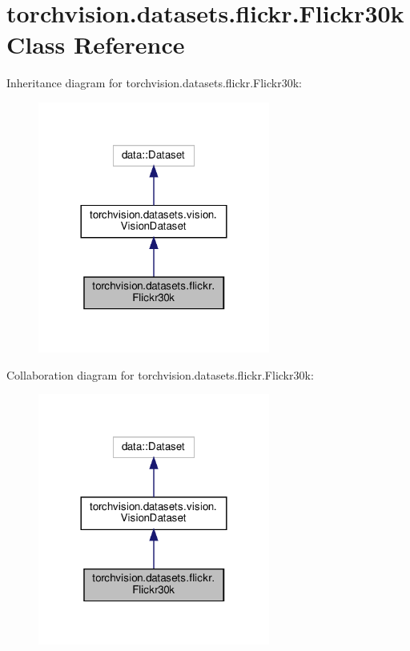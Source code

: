 \hypertarget{classtorchvision_1_1datasets_1_1flickr_1_1Flickr30k}{}\section{torchvision.\+datasets.\+flickr.\+Flickr30k Class Reference}
\label{classtorchvision_1_1datasets_1_1flickr_1_1Flickr30k}


Inheritance diagram for torchvision.\+datasets.\+flickr.\+Flickr30k\+:
\nopagebreak
\begin{figure}[H]
\begin{center}
\leavevmode
\includegraphics[width=216pt]{classtorchvision_1_1datasets_1_1flickr_1_1Flickr30k__inherit__graph}
\end{center}
\end{figure}


Collaboration diagram for torchvision.\+datasets.\+flickr.\+Flickr30k\+:
\nopagebreak
\begin{figure}[H]
\begin{center}
\leavevmode
\includegraphics[width=216pt]{classtorchvision_1_1datasets_1_1flickr_1_1Flickr30k__coll__graph}
\end{center}
\end{figure}
